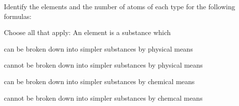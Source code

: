 \documentclass[addpoints, 12pt]{exam}
\begin{document}
\begin{questions}


\question[8] Identify the elements and the number of atoms of each type for
  the following formulas:


\question[4] Choose all that apply:  An element is a substance which
\begin{choices}
  \choice can be broken down into simpler substances by physical means

  \choice cannot be broken down into simpler substances by physical means

  \choice   can be broken down into simpler substances by chemical means

  \choice  cannot be broken down into simpler substances by chemcal means
  
\end{choices}


\end{questions}
\end{document}
